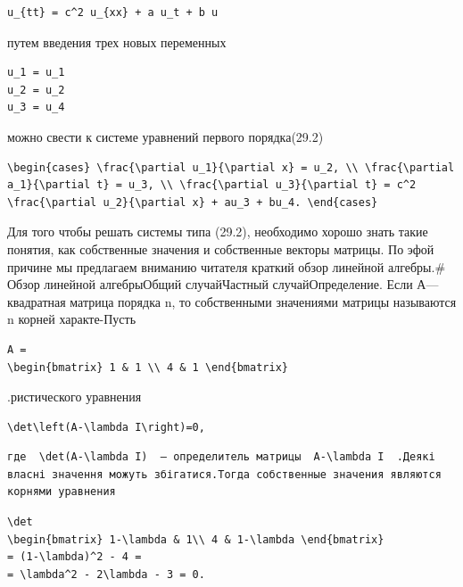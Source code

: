 \documentclass[
  ukrainian,
]{article}
\begin{document}
\begin{verbatim}
u_{tt} = c^2 u_{xx} + a u_t + b u
\end{verbatim}

путем введения трех новых переменных

\begin{verbatim}
u_1 = u_1
u_2 = u_2
u_3 = u_4
\end{verbatim}

можно свести к системе уравнений первого порядка(29.2)

\begin{verbatim}
\begin{cases} \frac{\partial u_1}{\partial x} = u_2, \\ \frac{\partial a_1}{\partial t} = u_3, \\ \frac{\partial u_3}{\partial t} = c^2 \frac{\partial u_2}{\partial x} + au_3 + bu_4. \end{cases}
\end{verbatim}

Для того чтобы решать системы типа (29.2), необходимо хорошо знать такие
понятия, как собственные значения и собственные векторы матрицы. По эфой
причине мы предлагаем вниманию читателя краткий обзор линейной
алгебры.\# Обзор линейной алгебрыОбщий случайЧастный случайОпределение.
Если А---квадратная матрица порядка n, то собственными значениями
матрицы называются n корней характе-Пусть

\begin{verbatim}
A =
\begin{bmatrix} 1 & 1 \\ 4 & 1 \end{bmatrix}
\end{verbatim}

.ристического уравнения

\begin{verbatim}
\det\left(A-\lambda I\right)=0,
\end{verbatim}

\begin{verbatim}
где  \det(A-\lambda I)  — определитель матрицы  A-\lambda I  .Деякі власні значення можуть збігатися.Тогда собственные значения являются корнями уравнения
\end{verbatim}

\begin{verbatim}
\det
\begin{bmatrix} 1-\lambda & 1\\ 4 & 1-\lambda \end{bmatrix}
= (1-\lambda)^2 - 4 =
= \lambda^2 - 2\lambda - 3 = 0.
\end{verbatim}
\end{document}
